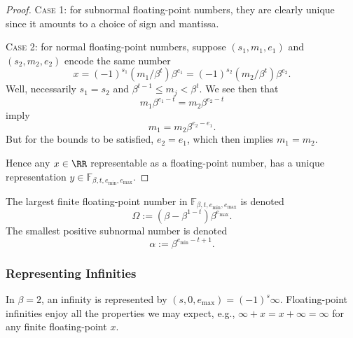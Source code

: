 \begin{proof}
\textsc{Case 1:} for subnormal floating-point numbers, they are clearly
unique since it amounts to a choice of sign and mantissa.

\textsc{Case 2:} for normal floating-point numbers, suppose
$(s_{1},m_{1},e_{1})$ and $(s_{2},m_{2},e_{2})$ encode the same number
\begin{equation}
  x = (-1)^{s_{1}}(m_{1}/\beta^{t})\beta^{e_{1}} = (-1)^{s_{2}}(m_{2}/\beta^{t})\beta^{e_{2}}.
\end{equation}
Well, necessarily $s_{1}=s_{2}$ and $\beta^{t-1}\leq m_{j} < \beta^{t}$.
We see then that
\begin{equation}
  m_{1}\beta^{e_{1}-t} = m_{2}\beta^{e_{2}-t}
\end{equation}
imply
\begin{equation}
  m_{1} = m_{2}\beta^{e_{2}-e_{1}}.
\end{equation}
But for the bounds to be satisfied, $e_{2}=e_{1}$, which then implies
$m_{1}=m_{2}$.

Hence any $x\in\RR$ representable as a floating-point number, has a unique
representation $y\in\mathbb{F}_{\beta,t,e_{\text{min}},e_{\text{max}}}$.
\end{proof}
\begin{defn}
  The largest finite floating-point number in $\mathbb{F}_{\beta,t,e_{\text{min}},e_{\text{max}}}$
  is denoted
  \begin{equation}
    \Omega := (\beta - \beta^{1-t})\beta^{e_{\text{max}}}.
  \end{equation}
  The smallest positive subnormal number is denoted
  \begin{equation}
    \alpha := \beta^{e_{\text{min}}-t+1}. 
  \end{equation}
\end{defn}

\subsubsection{Representing Infinities}

In $\beta=2$, an infinity is represented by $(s,0,e_{\text{max}})=(-1)^{s}\infty$.
Floating-point infinities enjoy all the properties we may expect, e.g.,
$\infty + x = x + \infty = \infty$ for any finite floating-point $x$.

